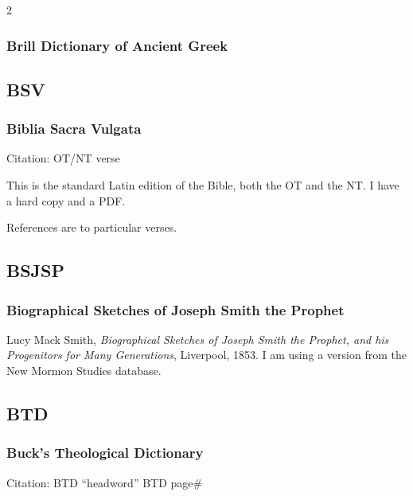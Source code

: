 \begin{multicols}{2}
		\subsubsection*{Brill Dictionary of Ancient Greek}
		
			\phantom{.}
			
	\subsection*{BSV}
	
		\subsubsection*{Biblia Sacra Vulgata}
		
			Citation:
				OT/NT verse
		
			This is the standard Latin edition of the Bible, both the OT and the NT. I have a hard copy and a PDF.
			
			References are to particular verses.
			
	\subsection*{BSJSP}
	
		\subsubsection*{Biographical Sketches of Joseph Smith the Prophet}
		
			Lucy Mack Smith, \textit{Biographical Sketches of Joseph Smith the Prophet, and his Progenitors for Many Generations}, Liverpool, 1853. I am using a version from the New Mormon Studies database.
			
	\subsection*{BTD}
	
		\subsubsection*{Buck's Theological Dictionary}
		
			Citation:
				BTD ``headword''
				BTD page\#
		

\end{multicols}
